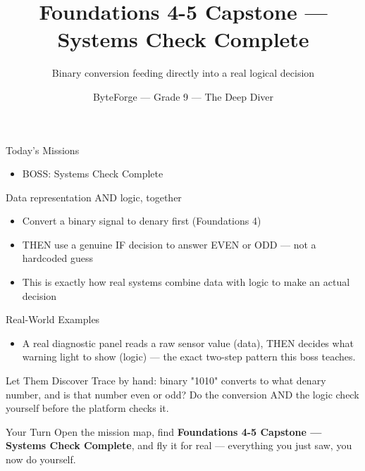 \documentclass[aspectratio=169]{beamer}
\title{Foundations 4-5 Capstone — Systems Check Complete}
\subtitle{Binary conversion feeding directly into a real logical decision}
\author{ByteForge --- Grade 9 --- The Deep Diver}
\date{}
\begin{document}
\begin{frame}
    \titlepage
\end{frame}

\begin{frame}{Today's Missions}
    \Large
    \begin{itemize}
        \item BOSS: Systems Check Complete
    \end{itemize}
\end{frame}

\begin{frame}{Data representation AND logic, together}
    \large
    \begin{itemize}
        \item Convert a binary signal to denary first (Foundations 4)
        \item THEN use a genuine IF decision to answer EVEN or ODD --- not a hardcoded guess
        \item This is exactly how real systems combine data with logic to make an actual decision
    \end{itemize}
\end{frame}

\begin{frame}{Real-World Examples}
    \large
    \begin{itemize}
        \item A real diagnostic panel reads a raw sensor value (data), THEN decides what warning light to show (logic) --- the exact two-step pattern this boss teaches.
    \end{itemize}
\end{frame}


\begin{frame}{Let Them Discover}
    \large
    Trace by hand: binary "1010" converts to what denary number, and is that number even or odd? Do the conversion AND the logic check yourself before the platform checks it.
\end{frame}

\begin{frame}{Your Turn}
    \Large
    Open the mission map, find \textbf{Foundations 4-5 Capstone — Systems Check Complete}, and fly it for real ---
    everything you just saw, you now do yourself.
\end{frame}
\end{document}
